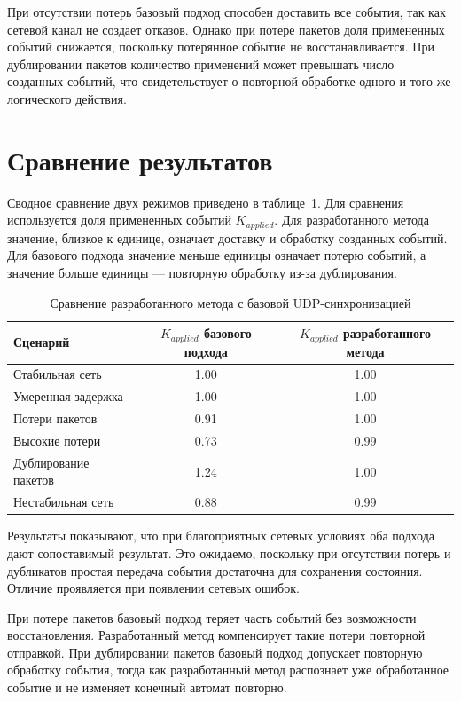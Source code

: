 При отсутствии потерь базовый подход способен доставить все события, так как сетевой канал не создает отказов. Однако при потере пакетов доля примененных событий снижается, поскольку потерянное событие не восстанавливается. При дублировании пакетов количество применений может превышать число созданных событий, что свидетельствует о повторной обработке одного и того же логического действия.

\section{Сравнение результатов}

Сводное сравнение двух режимов приведено в таблице~\ref{tab:research-comparison}. 
Для сравнения используется доля примененных событий $K_{applied}$. Для разработанного метода значение, близкое к единице, означает доставку и обработку созданных событий. 
Для базового подхода значение меньше единицы означает потерю событий, а значение больше единицы --- повторную обработку из-за дублирования.

\begin{table}[H]
	\caption{Сравнение разработанного метода с базовой UDP-синхронизацией}
	\label{tab:research-comparison}
	\centering
	\small
	\renewcommand{\arraystretch}{1.2}
	\begin{tabular}{|p{5cm}|c|c|}
		\hline
		Сценарий & $K_{applied}$ базового подхода & $K_{applied}$ разработанного метода \\ \hline
		Стабильная сеть & 1.00 & 1.00 \\ \hline
		Умеренная задержка & 1.00 & 1.00 \\ \hline
		Потери пакетов & 0.91 & 1.00 \\ \hline
		Высокие потери & 0.73 & 0.99 \\ \hline
		Дублирование пакетов & 1.24 & 1.00 \\ \hline
		Нестабильная сеть & 0.88 & 0.99 \\ \hline
	\end{tabular}
\end{table}

Результаты показывают, что при благоприятных сетевых условиях оба подхода дают сопоставимый результат. Это ожидаемо, поскольку при отсутствии потерь 
и дубликатов простая передача события достаточна для сохранения состояния. Отличие проявляется при появлении сетевых ошибок.

При потере пакетов базовый подход теряет часть событий без возможности восстановления. 
Разработанный метод компенсирует такие потери повторной отправкой. При дублировании пакетов базовый подход допускает повторную обработку события, 
тогда как разработанный метод распознает уже обработанное событие и не изменяет конечный автомат повторно.

